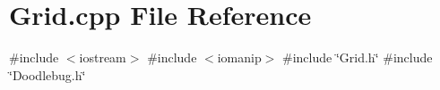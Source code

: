 \section{Grid.\+cpp File Reference}
\label{Grid_8cpp}
{\ttfamily \#include $<$iostream$>$}\newline
{\ttfamily \#include $<$iomanip$>$}\newline
{\ttfamily \#include \char`\"{}Grid.\+h\char`\"{}}\newline
{\ttfamily \#include \char`\"{}Doodlebug.\+h\char`\"{}}\newline
